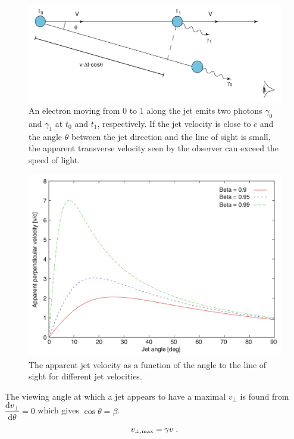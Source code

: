 \documentclass[12pt,a4paper]{article}
\newcommand{\dif}{\mathrm{d}}
\begin{document}
\begin{figure}
\begin{center}
\includegraphics[width=13cm]{Superluminal.png}
\caption{An electron moving from $0$ to $1$ along the jet emits two photons $\gamma_0$ and $\gamma_1$ at $t_0$ and $t_1$, respectively. If the jet velocity is close to $c$ and the angle $\theta$ between the jet direction and the line of sight is small, the apparent transverse velocity seen by the observer can exceed the speed of light.
}\label{FIG:Superluminal_Motion}
\end{center}
\end{figure}

\begin{figure}
\begin{center}
\includegraphics[width=12cm]{apparent_velocity.png}
\caption{The apparent jet velocity as a function of the angle to the line of sight for different jet velocities.
}\label{FIG:apparent_jet_velocity}
\end{center}
\end{figure}


The viewing angle at which a jet appears to have a maximal $v_\perp$ is found from $\dfrac{\dif v_\perp}{\dif \theta} = 0$ which gives $\cos \theta = \beta$.
\begin{equation}
v_{\perp, \rm max} = \gamma v ~.
\end{equation}
\end{document}
